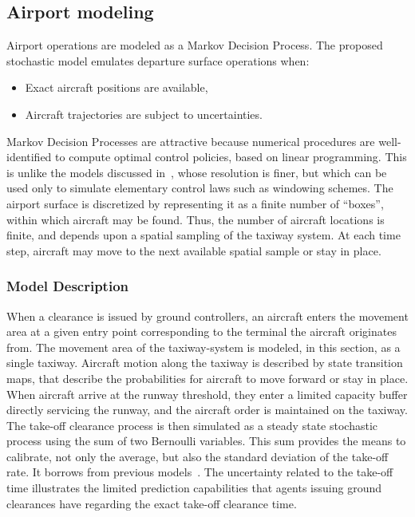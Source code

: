 \documentclass[letterpaper]{article}
\begin{document}
\subsection{Airport modeling} 
\label{s:1rModel}
Airport operations are modeled as a Markov Decision Process.
The proposed stochastic model emulates departure surface operations when:
 \begin{itemize}
 \item Exact aircraft positions are available,
 \item Aircraft trajectories are subject to uncertainties.
 \end{itemize}
Markov Decision Processes are attractive because numerical procedures are well-identified to compute optimal control policies, based on linear programming. This is unlike the models discussed in~\cite{log99}, whose resolution is finer, but which can be used only to simulate elementary control laws such as windowing schemes.
The airport surface is discretized by representing it as a finite number of ``boxes'', within which aircraft may be found.
Thus, the number of aircraft locations is finite, and depends upon a spatial sampling of the taxiway system. At each time step, aircraft may move to the next available spatial sample or stay in place. 
\iffalse
 \begin{figure}[h]
\centering
\texttt{[image: laguardiaMap.pdf]}
\caption{Map of LaGuardia Airport \cite{FlightAware2009}}
\label{laguardiaMap}
\end{figure}
\fi


\subsubsection{Model Description}
When a clearance is issued by ground controllers, an aircraft enters the movement area at a given entry point corresponding to the terminal the aircraft originates from. The movement area of the taxiway-system is modeled, in this section, as a single taxiway. Aircraft motion along the taxiway is described by state transition maps, that describe the probabilities for aircraft to move forward or stay in place.
When aircraft arrive at the runway threshold, they enter a limited capacity buffer directly servicing the runway, and the aircraft order is maintained on the taxiway. 
The take-off clearance process is then simulated as a steady state stochastic process using the sum of two Bernoulli variables. This sum provides the means to calibrate, not only the average, but also the standard deviation of the take-off rate. It borrows from previous models~\cite{log99}. The uncertainty related to the take-off time illustrates the limited prediction capabilities that agents issuing ground clearances have regarding the exact take-off clearance time.
\end{document}
